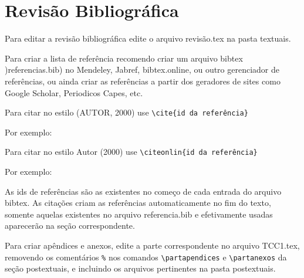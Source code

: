 \chapter{Revisão Bibliográfica}
Para editar a revisão bibliográfica edite o arquivo revisão.tex na pasta textuais. 
\par
Para criar a lista de referência recomendo criar um arquivo bibtex )referencias.bib) no Mendeley, Jabref, bibtex.online, ou outro gerenciador de referências, ou ainda criar as referências a partir dos geradores de sites como Google Scholar, Periodicos Capes, etc. 
\par
Para citar no estilo (AUTOR, 2000) use \verb+\cite{id da referência}+
\par
Por exemplo: \cite{Abuidris2019}
\par
Para citar no estilo Autor (2000) use \verb+\citeonlin{id da referência}+
\par
Por exemplo: 
\par
As ids de referências são as existentes no começo de cada entrada do arquivo bibtex. As citações criam as referências automaticamente no fim do texto, somente aquelas existentes no arquivo referencia.bib e efetivamente usadas aparecerão na seção correspondente.

Para criar apêndices e anexos, edite a parte correspondente no arquivo TCC1.tex, removendo os comentários \verb+%+ nos comandos \verb+\partapendices+ e \verb+\partanexos+ da seção postextuais, e incluindo os arquivos pertinentes na pasta postextuais.
